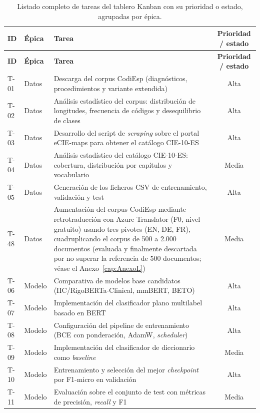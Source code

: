 \begin{center}
\small
\begin{longtable}{llp{7cm}c}
\caption{Listado completo de tareas del tablero Kanban con su prioridad o estado, agrupadas por épica.}\label{tab:kanban}\\
\hline
\textbf{ID} & \textbf{Épica} & \textbf{Tarea} & \textbf{Prioridad / estado} \\
\hline
\endfirsthead
\hline
\textbf{ID} & \textbf{Épica} & \textbf{Tarea} & \textbf{Prioridad / estado} \\
\hline
\endhead
\hline
\endfoot

T-01 & Datos & Descarga del corpus CodiEsp (diagnósticos, procedimientos y variante extendida) & Alta \\
T-02 & Datos & Análisis estadístico del corpus: distribución de longitudes, frecuencia de códigos y desequilibrio de clases & Alta \\
T-03 & Datos & Desarrollo del script de \emph{scraping} sobre el portal eCIE-maps para obtener el catálogo CIE-10-ES & Alta \\
T-04 & Datos & Análisis estadístico del catálogo CIE-10-ES: cobertura, distribución por capítulos y vocabulario & Media \\
T-05 & Datos & Generación de los ficheros CSV de entrenamiento, validación y test & Alta \\
T-48 & Datos & Aumentación del corpus CodiEsp mediante retrotraducción con Azure Translator (F0, nivel gratuito) usando tres pivotes (EN, DE, FR), cuadruplicando el corpus de 500 a 2.000 documentos (evaluada y finalmente descartada por no superar la referencia de 500 documentos; véase el Anexo~\ref{cap:AnexoL}) & Media \\
\hline
T-06 & Modelo & Comparativa de modelos base candidatos (IIC/RigoBERTa-Clinical, mmBERT, BETO) & Alta \\
T-07 & Modelo & Implementación del clasificador plano multilabel basado en BERT & Alta \\
T-08 & Modelo & Configuración del pipeline de entrenamiento (BCE con ponderación, AdamW, \emph{scheduler}) & Alta \\
T-09 & Modelo & Implementación del clasificador de diccionario como \emph{baseline} & Media \\
T-10 & Modelo & Entrenamiento y selección del mejor \emph{checkpoint} por F1-micro en validación & Alta \\
T-11 & Modelo & Evaluación sobre el conjunto de test con métricas de precisión, \emph{recall} y F1 & Media \\

\end{longtable}
\end{center}
